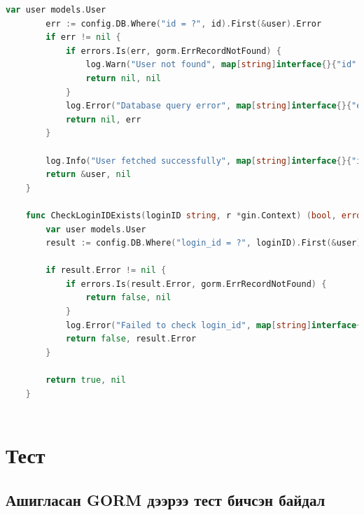\begin{lstlisting}[language=Go, frame=single]
		var user models.User
		err := config.DB.Where("id = ?", id).First(&user).Error
		if err != nil {
			if errors.Is(err, gorm.ErrRecordNotFound) {
				log.Warn("User not found", map[string]interface{}{"id": id}, r)
				return nil, nil
			}
			log.Error("Database query error", map[string]interface{}{"error": err.Error()}, r)
			return nil, err
		}
	
		log.Info("User fetched successfully", map[string]interface{}{"id": id}, r)
		return &user, nil
	}
	
	func CheckLoginIDExists(loginID string, r *gin.Context) (bool, error) {
		var user models.User
		result := config.DB.Where("login_id = ?", loginID).First(&user)
	
		if result.Error != nil {
			if errors.Is(result.Error, gorm.ErrRecordNotFound) {
				return false, nil
			}
			log.Error("Failed to check login_id", map[string]interface{}{"error": result.Error.Error()}, r)
			return false, result.Error
		}
	
		return true, nil
	}
	
\end{lstlisting}

\section{Тест}
\subsection{Ашигласан GORM дээрээ тест бичсэн байдал}


